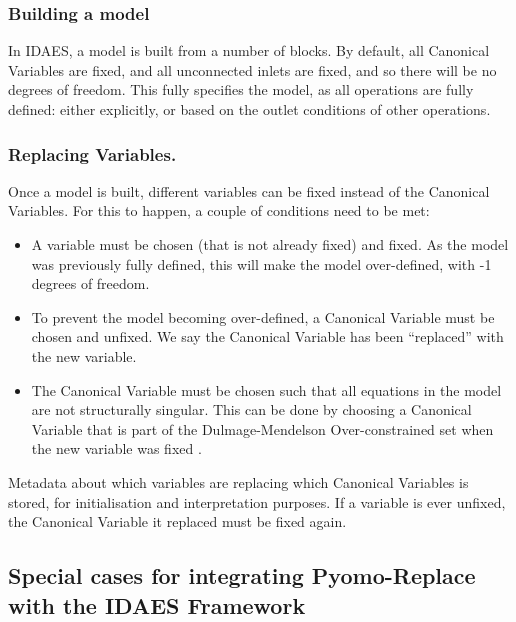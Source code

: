 \hypertarget{building-a-model}{%
\subsubsection{Building a model}\label{building-a-model}}

In IDAES, a model is built from a number of blocks. By default, all
Canonical Variables are fixed, and all unconnected inlets are fixed, and so
there will be no degrees of freedom. This fully specifies the model, as
all operations are fully defined: either explicitly, or based on the
outlet conditions of other operations.

\hypertarget{replacing-variables.}{%
\subsubsection{Replacing Variables.}\label{replacing-variables.}}

Once a model is built, different variables can be fixed instead of the
Canonical Variables. For this to happen, a couple of conditions need to be
met:

\begin{itemize}
\tightlist
\item
  A variable must be chosen (that is not already fixed) and fixed. As
  the model was previously fully defined, this will make the model
  over-defined, with -1 degrees of freedom.
\item
  To prevent the model becoming over-defined, a Canonical Variable must be
  chosen and unfixed. We say the Canonical Variable has been ``replaced''
  with the new variable.
\item
  The Canonical Variable must be chosen such that all equations in the model
  are not structurally singular. This can be done by choosing a
  Canonical Variable that is part of the Dulmage-Mendelson Over-constrained set 
  when the new variable was fixed \citep{lee2024model}.
\end{itemize}

Metadata about which variables are replacing which Canonical Variables is
stored, for initialisation and interpretation purposes.
If a variable is ever unfixed, the Canonical Variable it replaced
must be fixed again.


\hypertarget{special-cases-for-integrating-pyomo-replace-with-the-idaes-framework}{%
\subsection{Special cases for integrating Pyomo-Replace with the IDAES
Framework}\label{special-cases-for-integrating-pyomo-replace-with-the-idaes-framework}}

